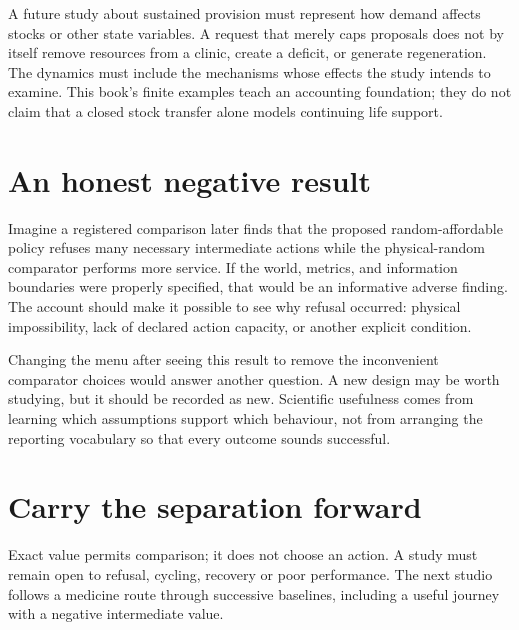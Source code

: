 A future study about sustained provision must represent how demand affects stocks or other state variables. A request that merely caps proposals does not by itself remove resources from a clinic, create a deficit, or generate regeneration. The dynamics must include the mechanisms whose effects the study intends to examine. This book's finite examples teach an accounting foundation; they do not claim that a closed stock transfer alone models continuing life support.

\section{An honest negative result}

Imagine a registered comparison later finds that the proposed random-affordable policy refuses many necessary intermediate actions while the physical-random comparator performs more service. If the world, metrics, and information boundaries were properly specified, that would be an informative adverse finding. The account should make it possible to see why refusal occurred: physical impossibility, lack of declared action capacity, or another explicit condition.

Changing the menu after seeing this result to remove the inconvenient comparator choices would answer another question. A new design may be worth studying, but it should be recorded as new. Scientific usefulness comes from learning which assumptions support which behaviour, not from arranging the reporting vocabulary so that every outcome sounds successful.

\section{Carry the separation forward}

Exact value permits comparison; it does not choose an action. A study must remain open to refusal, cycling, recovery or poor performance. The next studio follows a medicine route through successive baselines, including a useful journey with a negative intermediate value.
